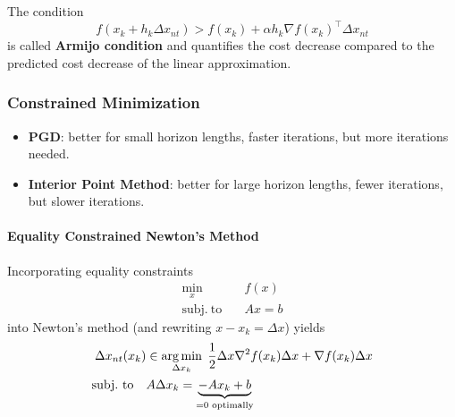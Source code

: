 The condition
\begin{equation*}
    f(x_k + h_k \Delta x_{nt}) > f(x_k) + \alpha h_k \nabla {f(x_k)}^\top \Delta x_{nt}
\end{equation*}
is called \textbf{Armijo condition} and quantifies the cost decrease compared to the predicted cost decrease of the linear approximation.

\subsubsection{Constrained Minimization}
\begin{itemize}
    \item \textbf{PGD}: better for small horizon lengths, faster iterations, but more iterations needed.
    \item \textbf{Interior Point Method}: better for large horizon lengths, fewer iterations, but slower iterations.
\end{itemize}

\paragraph{Equality Constrained Newton's Method}
Incorporating equality constraints
\noindent\begin{align*}
    \min_x \quad            & f(x) \\
    \mathrm{subj.\ to}\quad & Ax=b
\end{align*}
into Newton's method (and rewriting $x-x_k = \Delta x$) yields
\begin{align*}
    \Delta x_{nt}(x_k)       & \in \operatorname*{arg\,min}_{\Delta x_k} \; \frac{1}{2} \Delta x \nabla^2 f(x_k) \Delta x + \nabla f(x_k)\Delta x \\
    \mathrm{subj.\ to} \quad & A\Delta x_k = \underbrace{-Ax_k + b}_{=0 \text{ optimally}}
\end{align*}

\newpar{}

